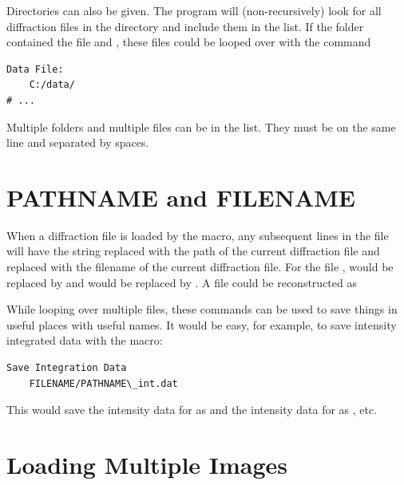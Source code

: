 Directories can also be given. The program 
will (non-recursively) look for all diffraction
files in the directory and include them in the list. If the folder
 contained the file 
and , these files could
be looped over with the command
\begin{lstlisting}
Data File:
    C:/data/
# ...
\end{lstlisting}
Multiple folders and multiple files can be in the list.
They must be on the same line and separated by spaces.

\section{PATHNAME and FILENAME}

When a diffraction file is loaded by the macro,
any subsequent lines in the file will have
the string  replaced with the
path of the current diffraction file and 
 replaced with the filename
of the current diffraction file.
For the file ,
 would be replaced by
 and  would
be replaced by . A 
file could be reconstructed as 

While looping over multiple files, these commands can be used to
save things in useful places with useful names. It would be
easy, for example, to save intensity integrated data with the
macro:
\begin{lstlisting}
Save Integration Data
    FILENAME/PATHNAME\_int.dat
\end{lstlisting}
This would save the intensity data for
 as
 and
the intensity data for  as
, etc. 

\section{Loading Multiple Images}


